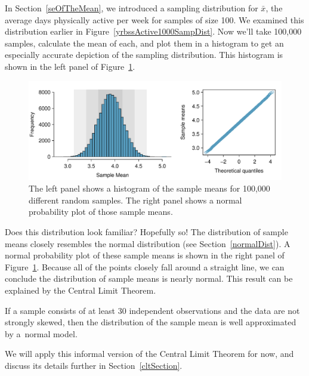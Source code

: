 In Section~\ref{seOfTheMean}, we introduced a sampling distribution for $\bar{x}$, the average days physically active per week for samples of size 100. We examined this distribution earlier in Figure~\ref{yrbssActive1000SampDist}. Now we'll take 100,000 samples, calculate the mean of each, and plot them in a histogram to get an especially accurate depiction of the sampling distribution. This histogram is shown in the left panel of Figure~\ref{yrbssActiveBigSampDist}.

\begin{figure}[hht]
   \centering
   \includegraphics[width=\textwidth]{ch_inference_foundations/figures/yrbssActiveBigSampDist/yrbssActiveBigSampDist}
   \caption{The left panel shows a histogram of the sample means for 100,000 different random samples. The right panel shows a normal probability plot of those sample means.}
   \label{yrbssActiveBigSampDist}
\end{figure}

Does this distribution look familiar? Hopefully so! The distribution of sample means closely resembles the normal distribution (see Section~\ref{normalDist}). A normal probability plot of these sample means is shown in the right panel of Figure~\ref{yrbssActiveBigSampDist}. Because all of the points closely fall around a straight line, we can conclude the distribution of sample means is nearly normal. This result can be explained by the Central Limit Theorem.

\begin{termBox}{
If a sample consists of at least 30 independent observations and the data are not strongly skewed, then the distribution of the sample mean is well approximated by a~normal model.}
\end{termBox}

We will apply this informal version of the Central Limit Theorem for now, and discuss its details further in Section~\ref{cltSection}.

